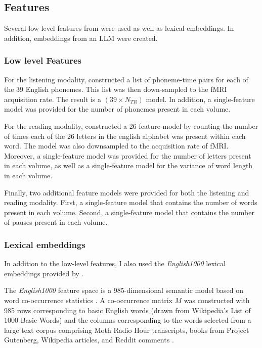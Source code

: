 \documentclass[a4paper]{article}
\begin{document}
\subsection*{Features} 
Several low level features from \textcite{deniz_representation_2019} were used as well as lexical embeddings. In addition, embeddings from an LLM were created.

\subsubsection*{Low level Features}

For the listening modality, \textcite{deniz_representation_2019} constructed a list of phoneme-time pairs for each of the 39 English phonemes. This list was then down-sampled to the fMRI acquisition rate. The result is a $(39 \times N_{TR})$ model. In addition, a single-feature model was provided for the number of phonemes present in each volume. 

For the reading modality, \textcite{deniz_representation_2019} constructed a 26 feature model by counting the number of times each of the 26 letters in the english alphabet was present within each word. The model was also downsampled to the acquisition rate of fMRI. Moreover, a single-feature model was provided for the number of letters present in each volume, as well as a single-feature model for the variance of word length in each volume.

Finally, two additional feature models were provided for both the listening and reading modality. First, a single-feature model that contains the number of words present in each volume. Second, a single-feature model that contains the number of pauses present in each volume.

\subsubsection*{Lexical embeddings}

In addition to the low-level features, I also used the \textit{English1000} lexical embeddings provided by \textcite{deniz_representation_2019}.

The \textit{English1000} feature space is a 985-dimensional semantic model based on word co-occurrence statistics \parencite{deerwester_indexing_1990, lund_producing_1996, mitchell_predicting_2008, huth_natural_2016}. A co-occurrence matrix $M$ was constructed with 985 rows corresponding to basic English words (drawn from Wikipedia's List of 1000 Basic Words) and the columns corresponding to the words selected from a large text corpus comprising Moth Radio Hour transcripts, books from Project Gutenberg, Wikipedia articles, and Reddit comments \parencite{huth_natural_2016}. 
\end{document}

